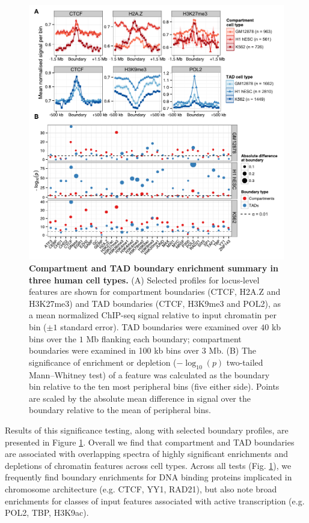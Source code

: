 \documentclass[a4paper,11pt,oneside]{book}
\begin{document}
\begin{figure}
\begin{center} 
\includegraphics[width=5.5in]{boundarysummary.pdf}
\captionsetup{width=\textwidth}
\caption[Compartment and TAD boundary enrichment summary in three human cell types.]{ {\bf Compartment and TAD boundary enrichment summary in three human cell types.}
(A) Selected profiles for locus-level features are shown for compartment boundaries (CTCF, H2A.Z and H3K27me3) and TAD boundaries (CTCF, H3K9me3 and POL2), as a mean normalized ChIP-seq signal relative to input chromatin per bin ($\pm1$ standard error). TAD boundaries were examined over $40$ kb bins over the $1$ Mb flanking each boundary; compartment boundaries were examined in 100 kb bins over $3$ Mb. (B) The significance of enrichment or depletion ($-\log_{10}(p)$ two-tailed Mann--Whitney test) of a feature was calculated as the boundary bin relative to the ten most peripheral bins (five either side). Points are scaled by the absolute mean difference in signal over the boundary relative to the mean of peripheral bins.
}\label{fig:boundarysummary}
\end{center}
\end{figure} 

Results of this significance testing, along with selected boundary profiles, are presented in Figure \ref{fig:boundarysummary}. Overall we find that compartment and TAD boundaries are associated with overlapping spectra of highly significant enrichments and depletions of chromatin features across cell types. Across all tests (Fig. \ref{fig:boundarysummary}), we frequently find boundary enrichments for DNA binding proteins implicated in chromosome architecture (e.g. CTCF, YY1, RAD21), but also note broad enrichments for classes of input features associated with active transcription (e.g. POL2, TBP, H3K9ac). 
\end{document}
